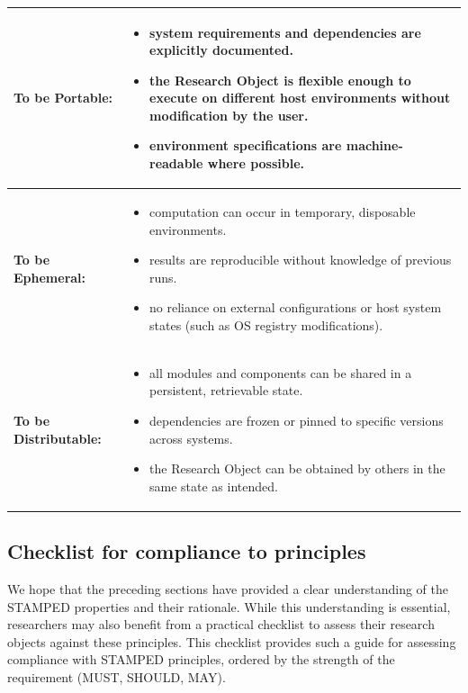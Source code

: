 \documentclass{article}
\begin{document}
\begin{table}[ht]
\begin{tabular}{|l|p{10cm}|}
\hline
\textbf{To be Portable:} &
\begin{itemize}[noitemsep,topsep=0pt,leftmargin=*]
  \item system requirements and dependencies are explicitly documented.
  \item the Research Object is flexible enough to execute on different host environments without modification by the user.
  \item environment specifications are machine-readable where possible.
\end{itemize} \\
\hline
\textbf{To be Ephemeral:} &
\begin{itemize}[noitemsep,topsep=0pt,leftmargin=*]
  \item computation can occur in temporary, disposable environments.
  \item results are reproducible without knowledge of previous runs.
  \item no reliance on external configurations or host system states (such as OS registry modifications).
\end{itemize} \\
\hline
\textbf{To be Distributable:} &
\begin{itemize}[noitemsep,topsep=0pt,leftmargin=*]
  \item all modules and components can be shared in a persistent, retrievable state.
  \item dependencies are frozen or pinned to specific versions across systems.
  \item the Research Object can be obtained by others in the same state as intended.
\end{itemize} \\
\hline
\end{tabular}
\label{tab:stamped-principles}
\end{table}





\subsection{Checklist for compliance to principles}

We hope that the preceding sections have provided a clear understanding of the STAMPED properties and their rationale.
While this understanding is essential, researchers may also benefit from a practical checklist to assess their research objects against these principles.
This checklist provides such a guide for assessing compliance with STAMPED principles, ordered by the strength of the requirement (MUST, SHOULD, MAY).
\end{document}
